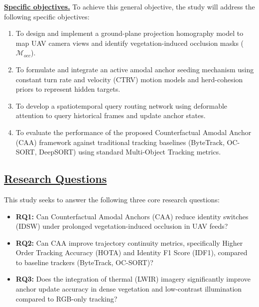 \documentclass[12pt]{article}
\begin{document}
\hspace*{0.5in}\underline{\textbf{Specific objectives.}}
To achieve this general objective, the study will address the following specific objectives:
\begin{enumerate}
    \item To design and implement a ground-plane projection homography model to map UAV camera views and identify vegetation-induced occlusion masks ($\mathcal{M}_{occ}$).
    \item To formulate and integrate an active amodal anchor seeding mechanism using constant turn rate and velocity (CTRV) motion models and herd-cohesion priors to represent hidden targets.
    \item To develop a spatiotemporal query routing network using deformable attention to query historical frames and update anchor states.
    \item To evaluate the performance of the proposed Counterfactual Amodal Anchor (CAA) framework against traditional tracking baselines (ByteTrack, OC-SORT, DeepSORT) using standard Multi-Object Tracking metrics.
\end{enumerate}

\subsection*{\underline{\textbf{Research Questions}}}
This study seeks to answer the following three core research questions:
\begin{itemize}
    \item \textbf{RQ1:} Can Counterfactual Amodal Anchors (CAA) reduce identity switches (IDSW) under prolonged vegetation-induced occlusion in UAV feeds?
    \item \textbf{RQ2:} Can CAA improve trajectory continuity metrics, specifically Higher Order Tracking Accuracy (HOTA) and Identity F1 Score (IDF1), compared to baseline trackers (ByteTrack, OC-SORT)?
    \item \textbf{RQ3:} Does the integration of thermal (LWIR) imagery significantly improve anchor update accuracy in dense vegetation and low-contrast illumination compared to RGB-only tracking?
\end{itemize}
\end{document}
